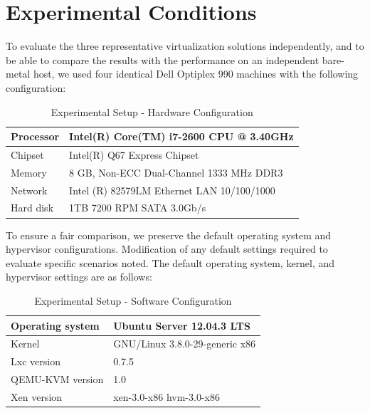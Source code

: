 \section{Experimental Conditions}

To evaluate the three representative virtualization solutions independently, and to be able to compare the results with the performance on an independent bare-metal host, we used four identical Dell Optiplex 990 machines with the following configuration:
\newline
\begin{table}[h!]
\begin{center}
\renewcommand{\arraystretch}{1.5}
\begin{tabular}{ | l | l | }
  \hline                        
  Processor & Intel(R) Core(TM) i7-2600 CPU @ 3.40GHz \\ \hline
  Chipset & Intel(R) Q67 Express Chipset \\ \hline
  Memory & 8 GB, Non-ECC Dual-Channel 1333 MHz DDR3  \\ \hline
  Network & Intel (R) 82579LM Ethernet LAN 10/100/1000 \\ \hline
  Hard disk & 1TB 7200 RPM SATA 3.0Gb/s \\
  \hline  
\end{tabular}
\end{center}
\caption{Experimental Setup - Hardware Configuration}
\end{table}


To ensure a fair comparison, we preserve the default operating system and hypervisor configurations. Modification of any default settings required to evaluate specific scenarios noted. The default operating system, kernel, and hypervisor settings are as follows:
\newline

\begin{table}[h!]
\begin{center}
\renewcommand{\arraystretch}{1.5}
\begin{tabular}{ | l | l | }
  \hline                        
  Operating system & Ubuntu Server 12.04.3 LTS \\ \hline
  Kernel & GNU/Linux 3.8.0-29-generic x86\textunderscore 64 \\ \hline
  Lxc version & 0.7.5  \\ \hline  
  QEMU-KVM version & 1.0  \\  \hline 
  Xen version & xen-3.0-x86\textunderscore 64 hvm-3.0-x86\textunderscore 64  \\ \hline
\end{tabular}
\end{center}
\caption{Experimental Setup - Software Configuration}
\end{table}

